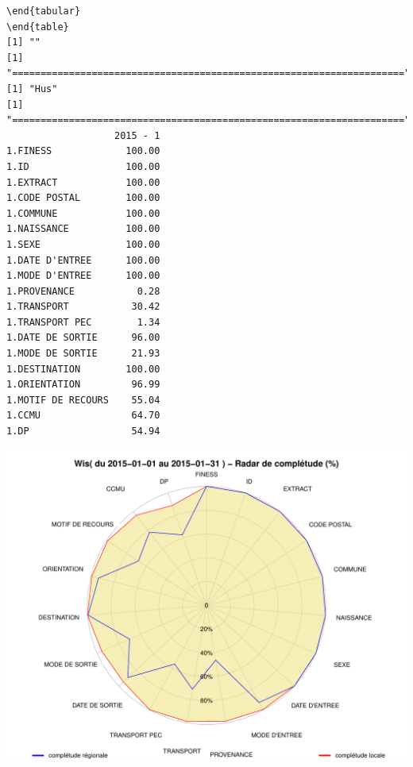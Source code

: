 \documentclass[]{article}
\begin{document}
\begin{verbatim}
\end{tabular} 
\end{table} 
[1] ""
[1] "====================================================================="
[1] "Hus"
[1] "====================================================================="
                   2015 - 1
1.FINESS             100.00
1.ID                 100.00
1.EXTRACT            100.00
1.CODE POSTAL        100.00
1.COMMUNE            100.00
1.NAISSANCE          100.00
1.SEXE               100.00
1.DATE D'ENTREE      100.00
1.MODE D'ENTREE      100.00
1.PROVENANCE           0.28
1.TRANSPORT           30.42
1.TRANSPORT PEC        1.34
1.DATE DE SORTIE      96.00
1.MODE DE SORTIE      21.93
1.DESTINATION        100.00
1.ORIENTATION         96.99
1.MOTIF DE RECOURS    55.04
1.CCMU                64.70
1.DP                  54.94
\end{verbatim}

\includegraphics{completude_files/figure-latex/finess-10.pdf}
\end{document}
